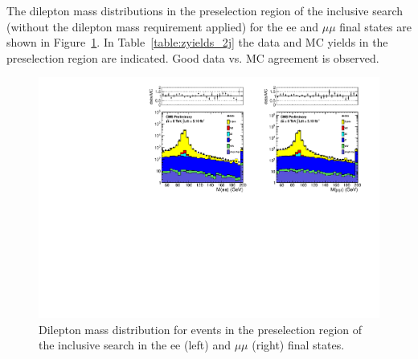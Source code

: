 The dilepton mass distributions in the preselection region of the inclusive search (without the dilepton mass requirement applied) 
for the ee and $\mu\mu$ final states are shown in Figure~\ref{fig:dilmass_2j}. In Table~\ref{table:zyields_2j} the data and MC yields in the preselection
region are indicated. Good data vs. MC agreement is observed.


\begin{figure}[hbt]
  \begin{center}
	\includegraphics[width=1.0\linewidth]{plots/dilmass_ee_mm_2j.pdf}
	\caption{
	  \label{fig:dilmass_2j}\protect 
	  Dilepton mass distribution for events in the preselection region of the inclusive search
	  in the ee (left) and $\mu\mu$ (right) final states.}
  \end{center}
\end{figure}

